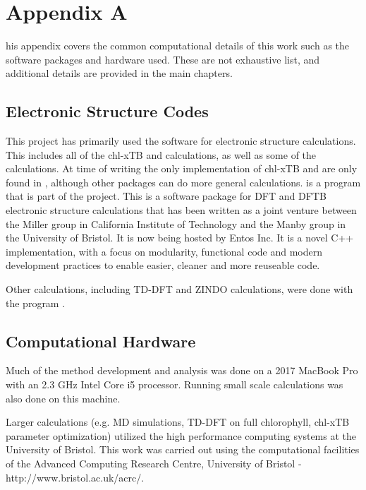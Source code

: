 %
%

\chapter{Appendix A}
\label{app:app01}

his appendix covers the common computational details of this work such
as the software packages and hardware used. These are not exhaustive list, and additional 
details are provided in the main chapters.

\section{Electronic Structure Codes}
This project has primarily used the  software for electronic structure
calculations. This includes all of the chl-xTB and \dxtb calculations, as well as
some of the \dscf calculations. At time of writing the only implementation of chl-xTB
and \dxtb are only found in , although other packages can do more general
\dscf calculations.
 is a program that is part of the  project. This is a software 
package for DFT and DFTB electronic structure calculations that has been written 
as a joint venture between the Miller group in California Institute of Technology 
and the Manby group in the University of Bristol. It is now being hosted by Entos Inc. 
It is a novel C++ implementation, with a focus on modularity, functional code and
modern development practices to enable easier, cleaner and more reuseable code.

Other calculations, including TD-DFT and ZINDO calculations, were done with the 
 program \cite{Gaussian16}.

\section{Computational Hardware}

Much of the method development and analysis was done on a 2017 MacBook Pro with 
an 2.3 GHz Intel Core i5 processor. Running small scale calculations was also done
on this machine.

Larger calculations (e.g. MD simulations, TD-DFT on full chlorophyll, chl-xTB parameter
optimization) utilized the high performance computing systems at the University 
of Bristol. This work was carried out using the computational facilities of the 
Advanced Computing Research Centre, University of Bristol - http://www.bristol.ac.uk/acrc/.

